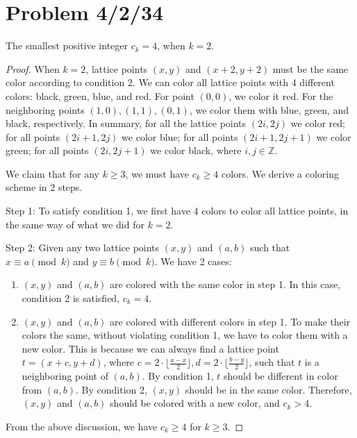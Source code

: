 \documentclass[11pt, oneside]{article}   	%
\begin{document}
 \newpage
 \section{Problem 4/2/34}


The smallest positive integer $c_k=4$, when $k=2$.
\begin{proof}

When $k=2$, lattice points $(x, y)$ and $(x+2, y+2)$ must be the same color according to condition 2. We can color all lattice points with 4 different colors: black, green, blue, and red. For point $(0, 0)$, we color it red. For the neighboring points $(1, 0), (1, 1), (0, 1)$, we color them with blue, green, and black, respectively. In summary, for all the lattice points $(2i, 2j)$ we color red; for all points $(2i+1, 2j)$ we color blue; for all points $(2i+1, 2j+1)$ we color green; for all points $(2i, 2j+1)$ we color black, where $i, j \in \mathbb{Z}$.

We claim that for any $k\ge 3$, we must have $c_k\ge 4$ colors. We derive a coloring scheme in 2 steps.

Step 1: To satisfy condition 1, we first have 4 colors to color all lattice points,  in the same way of what we did for $k=2$. 

Step 2: Given any two lattice points $(x, y)$ and $(a, b)$ such that $x\equiv a \pmod k$ and $y\equiv b \pmod k$.  We have 2 cases: 
\begin{enumerate}
\item $(x, y)$ and $(a, b)$  are colored with the same color in step 1. In this case, condition 2 is satisfied, $c_k=4$.

\item $(x, y)$ and $(a, b)$ are colored with different colors in step 1. To make their colors the same, without violating condition 1, we have to color them with a new color. This is because we can always find a lattice point $t = (x+c, y+d)$, where $c=2\cdot \lfloor\frac{a-x}{2}\rfloor, d=2\cdot \lfloor\frac{b-y}{2}\rfloor$, such that $t$ is a neighboring point of $(a, b)$. By condition 1, $t$ should be different in color from $(a, b)$. By condition 2, $(x, y)$ should be in the same color. Therefore, $(x, y)$ and $(a, b)$ should be colored with a new color, and $c_k> 4$. 


\end{enumerate}

From the above discussion, we have $c_k\ge 4$ for $k\ge 3$.





\end{proof}
\end{document}
